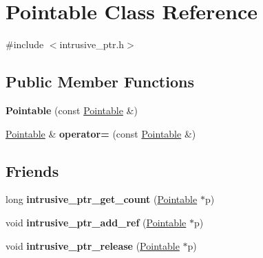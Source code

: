 \hypertarget{class_pointable}{\section{Pointable Class Reference}
\label{class_pointable}
}


{\ttfamily \#include $<$intrusive\-\_\-ptr.\-h$>$}

\subsection*{Public Member Functions}
\begin{DoxyCompactItemize}
\item 
\hypertarget{class_pointable_adc4da364054bdd4c4a9624f5dc190c8a}{{\bfseries Pointable} (const \hyperlink{class_pointable}{Pointable} \&)}\label{class_pointable_adc4da364054bdd4c4a9624f5dc190c8a}

\item 
\hypertarget{class_pointable_a8a7eb6956905e6e320ce97fa24f03b59}{\hyperlink{class_pointable}{Pointable} \& {\bfseries operator=} (const \hyperlink{class_pointable}{Pointable} \&)}\label{class_pointable_a8a7eb6956905e6e320ce97fa24f03b59}

\end{DoxyCompactItemize}
\subsection*{Friends}
\begin{DoxyCompactItemize}
\item 
\hypertarget{class_pointable_a9c08ce04af1d8cd2697b64990c51a5f4}{long {\bfseries intrusive\-\_\-ptr\-\_\-get\-\_\-count} (\hyperlink{class_pointable}{Pointable} $\ast$p)}\label{class_pointable_a9c08ce04af1d8cd2697b64990c51a5f4}

\item 
\hypertarget{class_pointable_a16ec5f964af06a93d6c7cfe0979ff672}{void {\bfseries intrusive\-\_\-ptr\-\_\-add\-\_\-ref} (\hyperlink{class_pointable}{Pointable} $\ast$p)}\label{class_pointable_a16ec5f964af06a93d6c7cfe0979ff672}

\item 
\hypertarget{class_pointable_aee25e5a73726af47eb078e2087eaee57}{void {\bfseries intrusive\-\_\-ptr\-\_\-release} (\hyperlink{class_pointable}{Pointable} $\ast$p)}\label{class_pointable_aee25e5a73726af47eb078e2087eaee57}

\end{DoxyCompactItemize}


